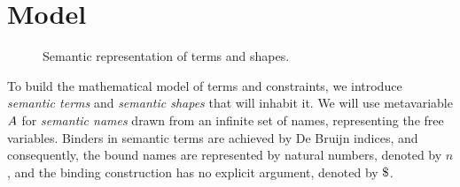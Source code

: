 \documentclass[english, mgr]{iithesis}
\renewcommand{\it}[1]{\textit{#1}}
\begin{document}
\section{Model}
\begin{figure}[htbp]
  \centering
  \caption{Semantic representation of terms and shapes.}
  \label{fig:semantic-terms-shapes}
\end{figure}
To build the mathematical model of terms and constraints,
we introduce \it{semantic terms} and \it{semantic shapes} that will inhabit it.
We will use metavariable $A$ for \it{semantic names} drawn from an
infinite set of names, representing the free variables.
Binders in semantic terms are achieved by De Bruijn indices\cite{deBruijn}, and consequently,
the bound names are represented by natural numbers, denoted by $n$,
and the binding construction has no explicit argument, denoted by $\stbind$.
\end{document}
